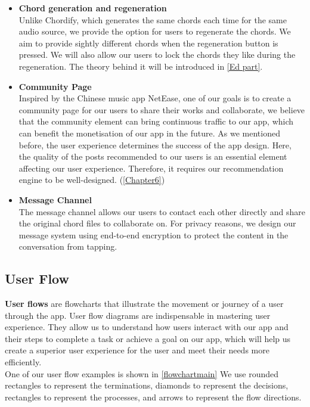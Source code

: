 \documentclass[11pt]{article}
\begin{document}
\begin{itemize}
\item \textbf{Chord generation and regeneration}
\\Unlike Chordify, which generates the same chords each time for the same audio source, we provide the option for users to regenerate the chords. We aim to provide sightly different chords when the regeneration button is pressed. 
We will also allow our users to lock the chords they like during the regeneration. The theory behind it will be introduced in \cref{Ed part}.

\item \textbf{Community Page}
\\Inspired by the Chinese music app NetEase, one of our goals is to create a community page for our users to share their works and collaborate, 
we believe that the community element can bring continuous traffic to our app, which can benefit the monetisation of our app in the future.
As we mentioned before, the user experience determines the success of the app design. Here, the quality of the posts recommended to our users is an essential element affecting our user experience. 
Therefore, it requires our recommendation engine to be well-designed. (\cref{Chapter6})

\item \textbf{Message Channel}
\\The message channel allows our users to contact each other directly and share the original chord files to collaborate on. For privacy reasons, we design our message system using end-to-end encryption to protect the content in the conversation from tapping.

\end{itemize}

\subsection{User Flow}
 \textbf{User flows} are flowcharts that illustrate the movement or journey of a user through the app. User flow diagrams are indispensable in mastering user experience. 
 They allow us to understand how users interact with our app and their steps to complete a task or achieve a goal on our app, 
 which will help us create a superior user experience for the user and meet their needs more efficiently. 
 \\One of our user flow examples is shown in \cref{flowchartmain}
 We use rounded rectangles to represent the terminations, diamonds to represent the decisions, rectangles to represent the processes, and arrows to represent the flow directions.
\end{document}
